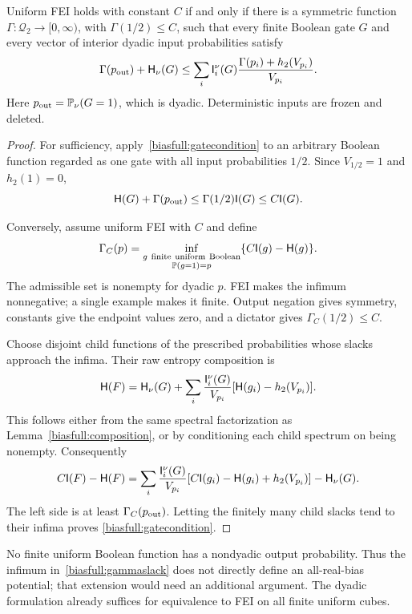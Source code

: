 \begin{proposition}\label{biasfull:gatepotential}
Uniform FEI holds with constant \(C\) if and only if there is a
symmetric function \(\Gamma:\mathcal Q_2\to[0,\infty)\), with
\(\Gamma(1/2)\le C\), such that every finite Boolean gate \(G\)
and every vector of interior dyadic input probabilities satisfy
\begin{equation}\label{biasfull:gatecondition}
 \Gamma(p_{\rm out})+\HH_\nu(G)
 \le\sum_i\I_i^\nu(G)
         \frac{\Gamma(p_i)+h_2(V_{p_i})}{V_{p_i}}.
\end{equation}
Here \(p_{\rm out}=\P_\nu(G=1)\), which is dyadic. Deterministic
inputs are frozen and deleted.
\end{proposition}
\begin{proof}
For sufficiency, apply~\eqref{biasfull:gatecondition} to an arbitrary
Boolean function regarded as one gate with all input probabilities
\(1/2\). Since \(V_{1/2}=1\) and \(h_2(1)=0\),
\[
 \HH(G)+\Gamma(p_{\rm out})
      \le\Gamma(1/2)\I(G)\le C\I(G).
\]

Conversely, assume uniform FEI with \(C\) and define
\begin{equation}\label{biasfull:gammaslack}
 \Gamma_C(p)=\inf_{\substack{g\ {\rm finite\ uniform\ Boolean}\\
                              \P(g=1)=p}}
                  \{C\I(g)-\HH(g)\}.
\end{equation}
The admissible set is nonempty for dyadic \(p\).
FEI makes the infimum nonnegative; a single example makes it finite.
Output negation gives symmetry, constants give the endpoint values
zero, and a dictator gives \(\Gamma_C(1/2)\le C\).

Choose disjoint child functions of the prescribed probabilities
whose slacks approach the infima. Their raw entropy composition is
\[
 \HH(F)=\HH_\nu(G)+
    \sum_i\frac{\I_i^\nu(G)}{V_{p_i}}
                  [\HH(g_i)-h_2(V_{p_i})].
\]
This follows either from the same spectral factorization as
Lemma~\ref{biasfull:composition}, or by conditioning each child
spectrum on being nonempty. Consequently
\[
 C\I(F)-\HH(F)=
 \sum_i\frac{\I_i^\nu(G)}{V_{p_i}}
      [C\I(g_i)-\HH(g_i)+h_2(V_{p_i})]-\HH_\nu(G).
\]
The left side is at least \(\Gamma_C(p_{\rm out})\).
Letting the finitely many child slacks tend to their infima proves
\eqref{biasfull:gatecondition}.
\end{proof}

No finite uniform Boolean function has a nondyadic output probability.
Thus the infimum in~\eqref{biasfull:gammaslack} does not directly
define an all-real-bias potential; that extension would need an
additional argument. The dyadic formulation already suffices for
equivalence to FEI on all finite uniform cubes.

